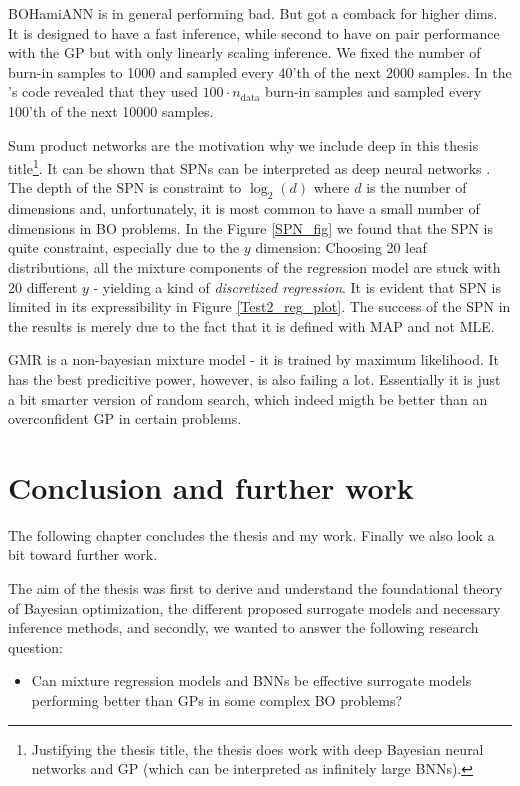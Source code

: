 BOHamiANN is in general performing bad. But got a comback for higher dims. It is designed to have a
fast inference, while second to have on pair performance with the GP but with only linearly scaling
inference. We fixed the number of burn-in samples to 1000 and sampled every 40'th of
the next 2000 samples. In the \cite{BOHAMIANN}'s code revealed that they used $100\cdot n_{\text{data}}$ burn-in
samples and sampled every 100'th of the next 10000 samples.

Sum product networks are the motivation why we include deep in this thesis title\footnote{Justifying the
thesis title, the thesis does work with deep Bayesian neural networks and GP (which can be
interpreted as infinitely large BNNs).}. It can be shown that SPNs can be interpreted as deep
neural networks \cite{SPNasNN}. The depth of the SPN is constraint to $\log_2 (d)$ where $d$ is the
number of dimensions and, unfortunately, it is most common to have a small number of dimensions in
BO problems. In the Figure \ref{SPN_fig} we found that the SPN is quite constraint, especially due
to the $y$ dimension: Choosing 20 leaf distributions, all the mixture components of the regression
model are stuck with 20 different $y$ - yielding a kind of \textit{discretized regression}. It is
evident that SPN is limited in its expressibility in Figure \ref{Test2_reg_plot}. The success of the
SPN in the results is merely due to the fact that it is defined with MAP and not MLE. 

GMR is a non-bayesian mixture model - it is trained by maximum likelihood. It has
the best predicitive power, however, is also failing a lot. Essentially it is just a bit smarter
version of random search, which indeed migth be better than an overconfident GP in certain problems.

\chapter{Conclusion and further work}
The following chapter concludes the thesis and my work. Finally we also look a bit toward
further work. 

The aim of the thesis was first to derive and understand the foundational theory of Bayesian
optimization, the different proposed surrogate models and necessary inference methods, and secondly,
we wanted to answer the following research question: 
\begin{itemize}
    \item Can mixture regression models and BNNs be effective surrogate models
    performing better than GPs in some complex BO problems? 
\end{itemize}


